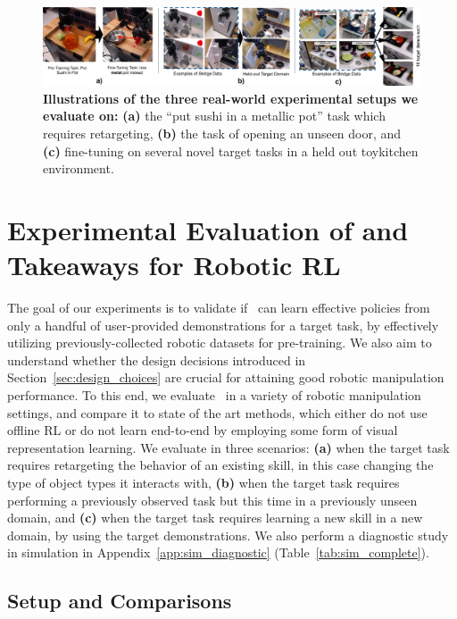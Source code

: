 \begin{figure}
\centering
  \includegraphics[width=1.0\linewidth]{chapters/ptr/scenarios_overview.pdf}
  \caption{\footnotesize{\textbf{Illustrations of the three real-world experimental setups we evaluate \ptrmethodname on:} \textbf{(a)} the ``put sushi in a metallic pot'' task which requires retargeting, \textbf{(b)} the task of opening an unseen door, and \textbf{(c)} fine-tuning on several novel target tasks in a held out toykitchen environment.}}
  \vspace{-0.6cm}
  \label{fig:experiments}
\end{figure}


\section{Experimental Evaluation of \ptrmethodname and Takeaways for Robotic RL}
\label{sec:result}
The goal of our experiments is to validate if \ptrmethodname\ can learn effective policies from only a handful of user-provided demonstrations for a target task, by effectively utilizing previously-collected robotic datasets for pre-training. We also aim to understand whether the design decisions introduced in Section~\ref{sec:design_choices} are crucial for attaining good robotic manipulation performance. To this end, we evaluate \ptrmethodname\ in a variety of robotic manipulation settings, and compare it to state of the art methods, which either do not use offline RL or do not learn end-to-end by employing some form of visual representation learning. We evaluate in three scenarios: \textbf{(a)} when the target task requires retargeting the behavior of an existing skill, in this case changing the type of object types it interacts with, \textbf{(b)} when the target task requires performing a previously observed task but this time in a previously unseen domain, and \textbf{(c)} when the target task requires learning a new skill in a new domain, by using the target demonstrations. We also perform a diagnostic study in simulation in Appendix~\ref{app:sim_diagnostic} (Table~\ref{tab:sim_complete}). 


\subsection{Setup and Comparisons}

